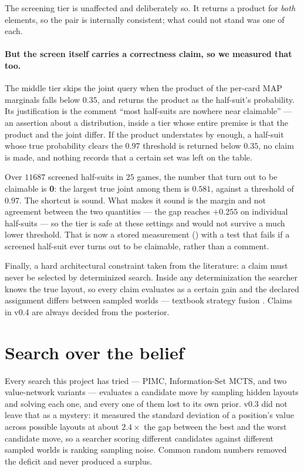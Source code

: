 \documentclass[11pt,a4paper]{article}
\begin{document}
The screening tier is unaffected and deliberately so. It returns a product for
\emph{both} elements, so the pair is internally consistent; what could not
stand was one of each.

\paragraph{But the screen itself carries a correctness claim, so we measured
that too.} The middle tier skips the joint query when the product of the
per-card MAP marginals falls below $0.35$, and returns the product as the
half-suit's probability. Its justification is the comment ``most half-suits are
nowhere near claimable'' --- an assertion about a distribution, inside a tier
whose entire premise is that the product and the joint differ. If the product
understates by enough, a half-suit whose true probability clears the $0.97$
threshold is returned below $0.35$, no claim is made, and nothing records that
a certain set was left on the table.

Over $11687$ screened half-suits in $25$ games, the number that turn out to be
claimable is \textbf{0}: the largest true joint among them is $0.581$, against
a threshold of $0.97$. The shortcut is sound. What makes it sound is the margin and not
agreement between the two quantities --- the gap reaches $+0.255$ on individual
half-suits --- so the tier is safe at these settings and would not survive a
much lower threshold. That is now a stored measurement
() with a test that fails if a
screened half-suit ever turns out to be claimable, rather than a comment.

Finally, a hard architectural constraint taken from the literature: a claim must
never be selected by determinized search. Inside any determinization the
searcher knows the true layout, so every claim evaluates as a certain gain and
the declared assignment differs between sampled worlds --- textbook strategy
fusion \citep{frank1998search}. Claims in v0.4 are always decided from the
posterior.

\section{Search over the belief}
\label{sec:lookahead}

Every search this project has tried --- PIMC, Information-Set MCTS, and two
value-network variants --- evaluates a candidate move by sampling hidden layouts
and solving each one, and every one of them lost to its own prior. v0.3 did not
leave that as a mystery: it measured the standard deviation of a position's
value across possible layouts at about $2.4\times$ the gap between the best and
the worst candidate move, so a searcher scoring different candidates against
different sampled worlds is ranking sampling noise. Common random numbers
removed the deficit and never produced a surplus.
\end{document}
